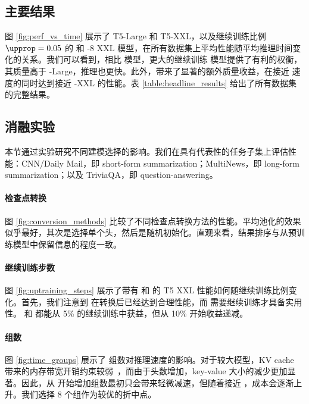 \documentclass[11pt]{article}
\begin{document}
\subsection{主要结果}

图 \ref{fig:perf_vs_time} 展示了 \mh T5-Large 和 T5-XXL，以及继续训练比例 $\upprop = 0.05$ 的 \mq 和 \gmq-$8$ XXL 模型，在所有数据集上平均性能随平均推理时间变化的关系。我们可以看到，相比 \mh 模型，更大的继续训练 \mq 模型提供了有利的权衡，其质量高于 \mh-Large，推理也更快。此外，\gmq 带来了显著的额外质量收益，在接近 \mq 速度的同时达到接近 \mh-XXL 的性能。表 \ref{table:headline_results} 给出了所有数据集的完整结果。




\subsection{消融实验}

本节通过实验研究不同建模选择的影响。我们在具有代表性的任务子集上评估性能：CNN/Daily Mail，即 short-form summarization；MultiNews，即 long-form summarization；以及 TriviaQA，即 question-answering。


\paragraph{检查点转换}
图 \ref{fig:conversion_methods} 比较了不同检查点转换方法的性能。平均池化的效果似乎最好，其次是选择单个头，然后是随机初始化。直观来看，结果排序与从预训练模型中保留信息的程度一致。



\paragraph{继续训练步数}
图 \ref{fig:uptraining_steps} 展示了带有 \mq 和 \gmq 的 T5 XXL 性能如何随继续训练比例变化。首先，我们注意到 \gmq 在转换后已经达到合理性能，而 \mq 需要继续训练才具备实用性。 \mq 和 \gmq 都能从 5\% 的继续训练中获益，但从 10\% 开始收益递减。



\paragraph{组数}

图 \ref{fig:time_groups} 展示了 \gmq 组数对推理速度的影响。对于较大模型，KV cache 带来的内存带宽开销约束较弱~\citep{shazeer2019mq}，而由于头数增加，key-value 大小的减少更加显著。因此，从 \mq 开始增加组数最初只会带来轻微减速，但随着接近 \mh，成本会逐渐上升。我们选择 8 个组作为较优的折中点。
\end{document}
